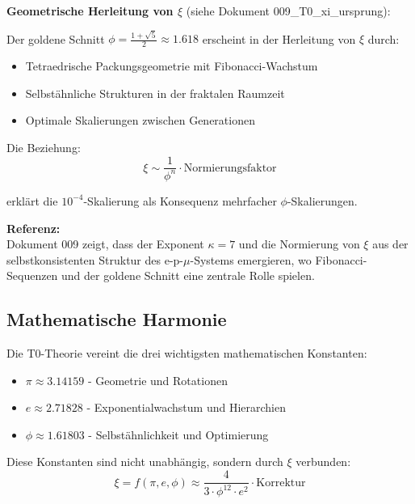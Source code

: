 	\begin{beziehung}
		\textbf{Geometrische Herleitung von $\xi$} (siehe Dokument 009\_T0\_xi\_ursprung):
		
		Der goldene Schnitt $\phi = \frac{1+\sqrt{5}}{2} \approx 1.618$ erscheint in der Herleitung von $\xi$ durch:
		
		\begin{itemize}
			\item Tetraedrische Packungsgeometrie mit Fibonacci-Wachstum
			\item Selbstähnliche Strukturen in der fraktalen Raumzeit
			\item Optimale Skalierungen zwischen Generationen
		\end{itemize}
		
		Die Beziehung:
		\begin{equation}
			\xi \sim \frac{1}{\phi^n} \cdot \text{Normierungsfaktor}
		\end{equation}
		
		erklärt die $10^{-4}$-Skalierung als Konsequenz mehrfacher $\phi$-Skalierungen.
		
		\textbf{Referenz:} \\

		Dokument 009 zeigt, dass der Exponent $\kappa = 7$ und die Normierung von $\xi$ aus der selbstkonsistenten Struktur des e-p-$\mu$-Systems emergieren, wo Fibonacci-Sequenzen und der goldene Schnitt eine zentrale Rolle spielen.
	\end{beziehung}
	
	\subsection{Mathematische Harmonie}
	
	Die T0-Theorie vereint die drei wichtigsten mathematischen Konstanten:
	
	\begin{itemize}
		\item $\pi \approx 3.14159$ - Geometrie und Rotationen
		\item $e \approx 2.71828$ - Exponentialwachstum und Hierarchien  
		\item $\phi \approx 1.61803$ - Selbstähnlichkeit und Optimierung
	\end{itemize}
	
	Diese Konstanten sind nicht unabhängig, sondern durch $\xi$ verbunden:
	\begin{equation}
		\xi = f(\pi, e, \phi) \approx \frac{4}{3 \cdot \phi^{12} \cdot e^2} \cdot \text{Korrektur}
	\end{equation}
	
